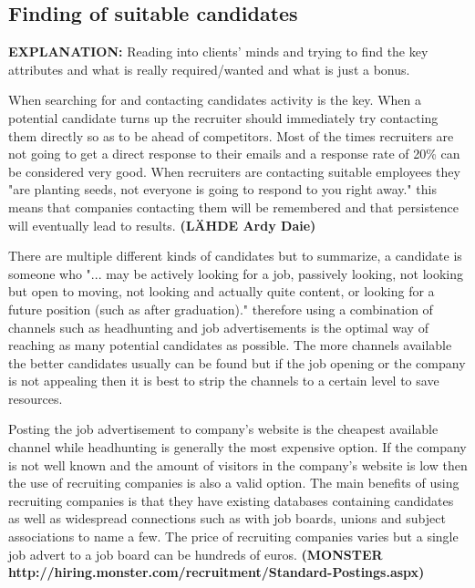 \documentclass[11pt,a4paper,oneside,article]{memoir}
\begin{document}
\subsection{Finding of suitable candidates}
\textbf{EXPLANATION:} Reading into clients’ minds and trying to find the key attributes and what is really required/wanted and what is just a bonus. 


When searching for and contacting candidates activity is the key. When a potential candidate turns up the recruiter should immediately try contacting them directly so as to be ahead of competitors. Most of the times recruiters are not going to get a direct response to their emails and a response rate of 20\% can be considered very good. When recruiters are contacting suitable employees they "are planting seeds, not everyone is going to respond to you right away." this means that companies contacting them will be remembered and that persistence will eventually lead to results. \textbf{(LÄHDE Ardy Daie)}

There are multiple different kinds of candidates but to summarize, a candidate is someone who "... may be actively looking for a job, passively looking, not looking but open to moving, not looking and actually quite content, or looking for a future position (such as after graduation)." \cite[p.~24]{mcculler:book} therefore using a combination of channels such as headhunting and job advertisements is the optimal way of reaching as many potential candidates as possible. The more channels available the better candidates usually can be found but if the job opening or the company is not appealing then it is best to strip the channels to a certain level to save resources.

Posting the job advertisement to company's website is the cheapest available channel while headhunting is generally the most expensive option. If the company is not well known and the amount of visitors in the company's website is low then the use of recruiting companies is also a valid option. The main benefits of using recruiting companies is that they have existing databases containing candidates as well as widespread connections such as with job boards, unions and subject associations to name a few. The price of recruiting companies varies but a single job advert to a job board can be hundreds of euros. \textbf{(MONSTER http://hiring.monster.com/recruitment/Standard-Postings.aspx)}
\end{document}
